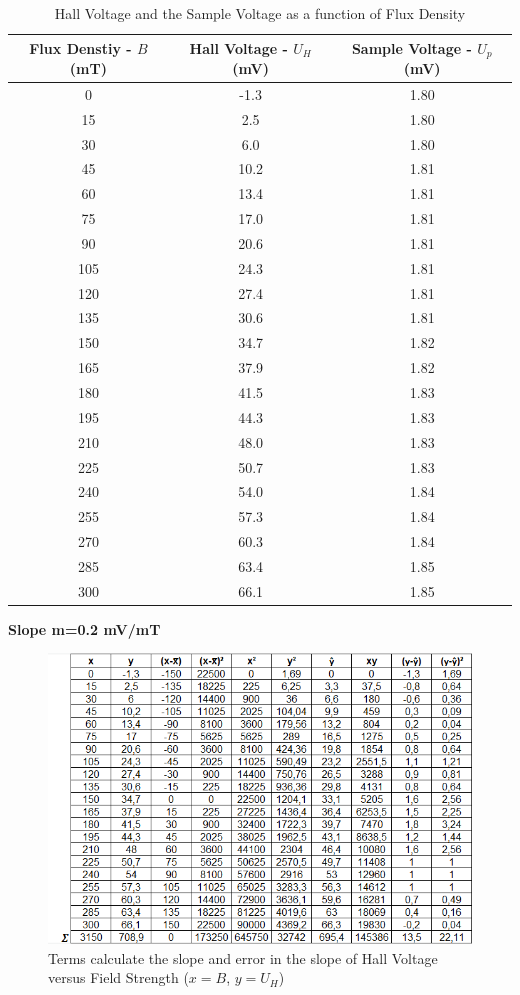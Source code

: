 \documentclass[a4paper,12pt]{article}
\begin{document}
\begin{table}[h!]
	\begin{center}
		\begin{tabular}{|c|c|c|}
	\hline Flux Denstiy - $B$ (mT) & Hall Voltage - $U_{H}$ (mV) & Sample Voltage - $U_{p}$ (mV) \\ 
	\hline 0 & -1.3 & 1.80 \\ 
	\hline 15 & 2.5 & 1.80 \\ 
	\hline 30 & 6.0 & 1.80 \\ 
	\hline 45 & 10.2 & 1.81 \\ 
	\hline 60 & 13.4 & 1.81 \\ 
	\hline 75 & 17.0 & 1.81 \\ 
	\hline 90 & 20.6 & 1.81 \\ 
	\hline 105 & 24.3 & 1.81 \\ 
	\hline 120 & 27.4 & 1.81 \\ 
	\hline 135 & 30.6 & 1.81 \\ 
	\hline 150 & 34.7 & 1.82 \\ 
	\hline 165 & 37.9 & 1.82 \\ 
	\hline 180 & 41.5 & 1.83 \\ 
	\hline 195 & 44.3 & 1.83 \\ 
	\hline 210 & 48.0 & 1.83 \\ 
	\hline 225 & 50.7 & 1.83 \\ 
	\hline 240 & 54.0 & 1.84 \\ 
	\hline 255 & 57.3 & 1.84 \\ 
	\hline 270 & 60.3 & 1.84 \\ 
	\hline 285 & 63.4 & 1.85 \\ 
	\hline 300 & 66.1 & 1.85 \\ 
	\hline 
\end{tabular} 
\caption{Hall Voltage and the Sample Voltage as a function of Flux Density}
	\end{center}
\end{table}
\begin{center}
	\textbf{Slope m=0.2 mV/mT}
\end{center}
\begin{figure}[h!]
\centering
\includegraphics[width=0.8\linewidth, height=0.28\textheight]{Fig}
\caption{Terms calculate the slope and error in the slope of Hall Voltage versus Field Strength ($x=B$, $y=U_{H}$)}
\label{fig:Fig}
\end{figure}
\end{document}
